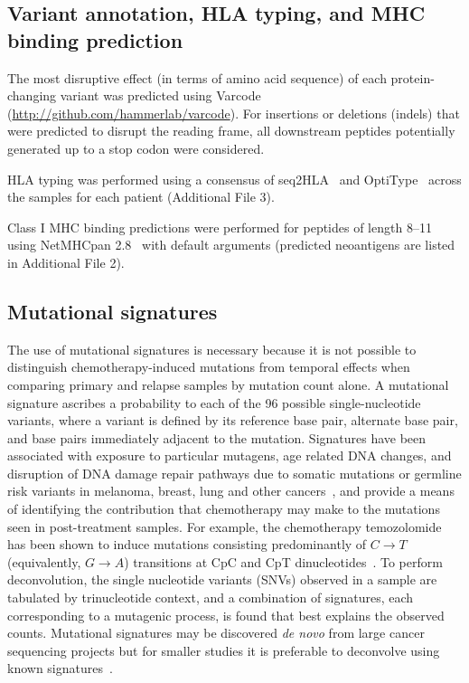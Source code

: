 \subsection*{Variant annotation, HLA typing, and MHC binding prediction}
\begin{sloppypar}
The most disruptive effect (in terms of amino acid sequence) of each protein-changing variant was predicted using Varcode (\url{http://github.com/hammerlab/varcode}). For insertions or deletions (indels) that were predicted to disrupt the reading frame, all downstream peptides potentially generated up to a stop codon were considered.

HLA typing was performed using a consensus of seq2HLA~\cite{Boegel_2012} and OptiType~\cite{Szolek_2014} across the samples for each patient (Additional File 3).

Class I MHC binding predictions were performed for peptides of length 8--11 using NetMHCpan 2.8~\cite{Lundegaard_2008} with default arguments (predicted neoantigens are listed in Additional File 2).
\end{sloppypar}

\subsection*{Mutational signatures}
The use of mutational signatures is necessary because it is not possible to distinguish chemotherapy-induced mutations from temporal effects when comparing primary and relapse samples by mutation count alone. A mutational signature ascribes a probability to each of the 96 possible single-nucleotide variants, where a variant is defined by its reference base pair, alternate base pair, and base pairs immediately adjacent to the mutation. Signatures have been associated with exposure to particular mutagens, age related DNA changes, and disruption of DNA damage repair pathways due to somatic mutations or germline risk variants in melanoma, breast, lung and other cancers~\cite{Alexandrov2013}, and provide a means of identifying the contribution that chemotherapy may make to the mutations seen in post-treatment samples. For example, the chemotherapy temozolomide has been shown to induce mutations consisting predominantly of $C \rightarrow T$ (equivalently, $G \rightarrow A$) transitions at CpC and CpT dinucleotides~\cite{Johnson_2013}. To perform deconvolution, the single nucleotide variants (SNVs) observed in a sample are tabulated by trinucleotide context, and a combination of signatures, each corresponding to a mutagenic process, is found that best explains the observed counts. Mutational signatures may be discovered \textit{de novo} from large cancer sequencing projects but for smaller studies it is preferable to deconvolve using known signatures~\cite{Rosenthal_2016}.


